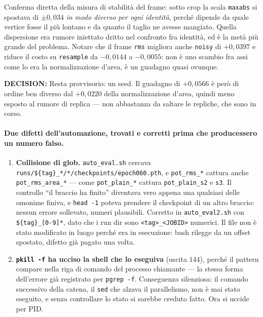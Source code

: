 \documentclass[11pt,a4paper]{article}
\newcommand{\decision}[1]{\textcolor{decision}{\textbf{DECISION:}} #1}
\begin{document}
Conferma diretta della misura di stabilit\`a del frame: sotto crop la scala \texttt{maxabs} si
spostava di $\pm 0{,}034$ \emph{in modo diverso per ogni identit\`a}, perch\'e dipende da quale
vertice fosse il pi\`u lontano e da quanto il taglio ne avesse mangiato. Quella dispersione era
rumore iniettato dritto nel confronto fra identit\`a, ed \`e la met\`a pi\`u grande del problema.
Notare che il frame \texttt{rms} migliora anche \texttt{noisy} di $+0{,}0397$ e riduce il costo su
\texttt{resample} da $-0{,}0144$ a $-0{,}0055$: non \`e uno scambio fra assi come lo era la
normalizzazione d'area, \`e un guadagno quasi ovunque.

\decision{Resta provvisorio: un seed. Il guadagno di $+0{,}0566$ \`e per\`o di ordine ben diverso
dal $+0{,}0220$ della normalizzazione d'area, quindi meno esposto al rumore di replica --- non
abbastanza da saltare le repliche, che sono in corso.}

\paragraph{Due difetti dell'automazione, trovati e corretti prima che producessero un numero
falso.}
\begin{enumerate}
\item \textbf{Collisione di glob.} \texttt{auto\_eval.sh} cercava
      \texttt{runs/\$\{tag\}\_*/*/checkpoints/epoch060.pth}, e \texttt{pot\_rms\_*} cattura anche
      \texttt{pot\_rms\_area\_*} --- come \texttt{pot\_plain\_*} cattura \texttt{pot\_plain\_s2}
      e \texttt{s3}. Il controllo ``il braccio ha finito'' diventava vero appena una qualsiasi
      delle omonime finiva, e \texttt{head -1} poteva prendere il checkpoint di un altro braccio:
      nessun errore sollevato, numeri plausibili. Corretto in \texttt{auto\_eval2.sh} con
      \texttt{\$\{tag\}\_[0-9]*}, dato che i run dir sono \texttt{<tag>\_<JOBID>} numerici. Il
      file non \`e stato modificato in luogo perch\'e era in esecuzione: bash rilegge da un
      offset spostato, difetto gi\`a pagato una volta.
\item \textbf{\texttt{pkill -f} ha ucciso la shell che lo eseguiva} (uscita $144$), perch\'e il
      pattern compare nella riga di comando del processo chiamante --- la stessa forma dell'errore
      gi\`a registrato per \texttt{pgrep -f}. Conseguenza silenziosa: il comando successivo della
      catena, il \texttt{sed} che alzava il parallelismo, non \`e mai stato eseguito, e senza
      controllare lo stato si sarebbe creduto fatto. Ora si uccide per PID.
\end{enumerate}
\end{document}
